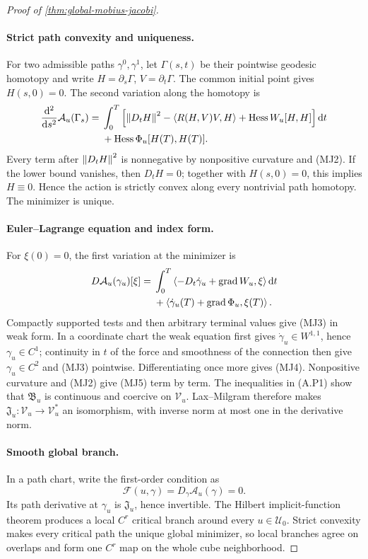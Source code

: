 \begin{proof}[Proof of \cref{thm:global-mobius-jacobi}]
\paragraph{Strict path convexity and uniqueness.}
For two admissible paths \(\gamma^0,\gamma^1\), let
\(\Gamma(s,t)\) be their pointwise geodesic homotopy and write
\(H=\partial_s\Gamma\), \(V=\partial_t\Gamma\).  The common initial point
gives \(H(s,0)=0\).  The second variation along the homotopy is
\[
\begin{aligned}
  \frac{\mathrm d^2}{\mathrm d s^2}\mathcal A_u(\Gamma_s)
  ={}&\int_0^T
  \left[\left\lVert D_tH\right\rVert^2
  -\left\langle R(H,V)V,H\right\rangle
  +\operatorname{Hess}W_u[H,H]\right]\mathrm d t\\
  &+\operatorname{Hess}\Phi_u[H(T),H(T)].
\end{aligned}
\]
Every term after \(\left\lVert D_tH\right\rVert^2\) is nonnegative by nonpositive curvature
and (MJ2).  If the lower bound vanishes, then \(D_tH=0\); together with
\(H(s,0)=0\), this implies \(H\equiv0\).  Hence the action is strictly convex
along every nontrivial path homotopy.  The minimizer is unique.

\paragraph{Euler--Lagrange equation and index form.}
For \(\xi(0)=0\), the first variation at the minimizer is
\[
\begin{aligned}
  D\mathcal A_u(\gamma_u)[\xi]
  ={}&\int_0^T
  \left\langle -D_t\dot\gamma_u+\operatorname{grad}W_u,\xi\right\rangle\mathrm d t\\
  &+\left\langle \dot\gamma_u(T)+\operatorname{grad}\Phi_u,\xi(T)\right\rangle.
\end{aligned}
\]
Compactly supported tests and then arbitrary terminal values give (MJ3) in
weak form.  In a coordinate chart the weak equation first gives
\(\dot\gamma_u\in W^{1,1}\), hence \(\gamma_u\in C^1\); continuity in
\(t\) of the force and smoothness of the connection then give
\(\gamma_u\in C^2\) and (MJ3) pointwise.  Differentiating once more gives
(MJ4).  Nonpositive
curvature and (MJ2) give (MJ5) term by term.  The inequalities in (A.P1) show
that \(\mathfrak B_u\) is continuous and coercive on \(\mathcal V_u\).
Lax--Milgram therefore makes
\(\mathfrak J_u:\mathcal V_u\to\mathcal V_u^*\) an isomorphism, with inverse
norm at most one in the derivative norm.

\paragraph{Smooth global branch.}
In a path chart, write the first-order condition as
\[
  \mathscr F(u,\gamma)=D_\gamma\mathcal A_u(\gamma)=0.
\]
Its path derivative at \(\gamma_u\) is \(\mathfrak J_u\), hence invertible.
The Hilbert implicit-function theorem produces a local \(C^r\) critical
branch around every \(u\in\mathcal U_0\).  Strict convexity makes every
critical path the unique global minimizer, so local branches agree on overlaps
and form one \(C^r\) map on the whole cube neighborhood.


\end{proof}
